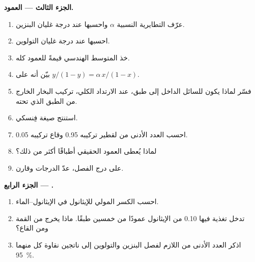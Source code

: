\begin{problem}
\medskip
\noindent\textbf{الجزء الثالث --- العمود.}
\begin{enumerate}[resume]
  \item عرّف التطايرية النسبية $\alpha$ واحسبها عند درجة
        غليان البنزين.
  \item احسبها عند درجة غليان التولوين.
  \item خذ المتوسط الهندسي قيمةً للعمود كله.
  \item بيّن أنه على  $y/(1 - y) = \alpha\,x/(1 - x)$.
  \item فسّر لماذا يكون للسائل الداخل إلى طبق، عند الارتداد الكلي،
        تركيب البخار الخارج من الطبق الذي تحته.
  \item استنتج صيغة فِنسكي.
  \item احسب العدد الأدنى من  لقطير تركيبه
        0.95 وقاع تركيبه 0.05.
  \item لماذا يُعطى العمود الحقيقي أطباقًا أكثر من ذلك؟
  \item على درج الفصل، عدّ الدرجات وقارن.
\end{enumerate}

\medskip
\noindent\textbf{الجزء الرابع --- .}
\begin{enumerate}[resume]
  \item احسب الكسر المولي للإيثانول في  الإيثانول--الماء.
  \item تدخل تغذية فيها 0.10 من الإيثانول عمودًا من خمسين طبقًا. ماذا يخرج
        من القمة ومن القاع؟
  \item اذكر العدد الأدنى من  اللازم لفصل
        البنزين والتولوين إلى ناتجين نقاوة كل منهما 95~\%.
\end{enumerate}
\end{problem}
